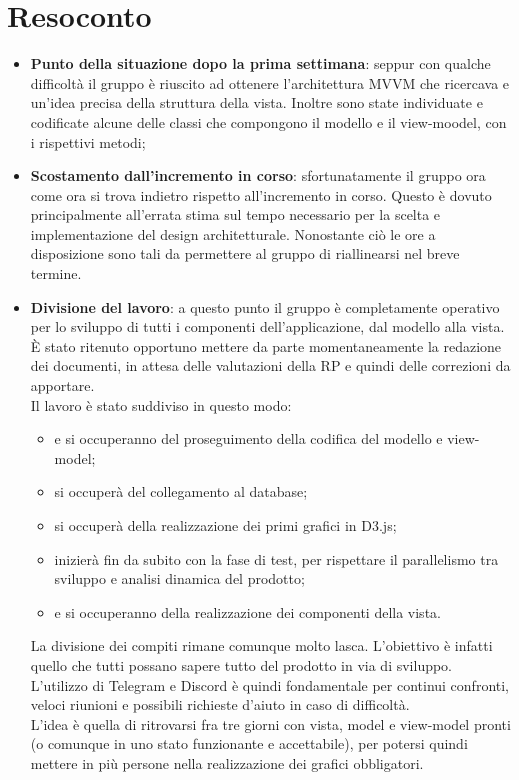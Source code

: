 \section{Resoconto}
\begin{itemize}
	\item \textbf{Punto della situazione dopo la prima settimana}: seppur con qualche difficoltà il gruppo è riuscito ad ottenere  l'architettura MVVM che ricercava e un'idea precisa della struttura della vista. Inoltre sono state individuate e codificate alcune delle classi che compongono il modello e il view-moodel, con i rispettivi metodi;
	\item \textbf{Scostamento dall'incremento in corso}: sfortunatamente il gruppo ora come ora si trova indietro rispetto all'incremento in corso. Questo è dovuto principalmente all'errata stima sul tempo necessario per la scelta e implementazione del design architetturale. Nonostante ciò le ore a disposizione sono tali da permettere al gruppo di riallinearsi nel breve termine.
	\item  \textbf{Divisione del lavoro}: a questo punto il gruppo è completamente operativo per lo sviluppo di tutti i componenti dell'applicazione, dal modello alla vista. È stato ritenuto opportuno mettere da parte momentaneamente la redazione dei documenti, in attesa delle valutazioni della RP e quindi delle correzioni da apportare. \\
	Il lavoro è stato suddiviso in questo modo:
	\begin{itemize}
		\item \BM{} e \SG{} si occuperanno del proseguimento della codifica del modello e view-model;
		\item \SH{} si occuperà del collegamento al database;
		\item \PA{} si occuperà della realizzazione dei primi grafici in D3.js;
		\item \ZM{} inizierà fin da subito con la fase di test, per rispettare il parallelismo tra sviluppo e analisi dinamica del prodotto;
		\item \SP{} e \RA{} si occuperanno della realizzazione dei componenti della vista.
	\end{itemize}
	La divisione dei compiti rimane comunque molto lasca. L'obiettivo è infatti quello che tutti possano sapere tutto del prodotto in via di sviluppo. L'utilizzo di Telegram e Discord è quindi fondamentale per continui confronti, veloci riunioni e possibili richieste d'aiuto in caso di difficoltà. \\
	L'idea è quella di ritrovarsi fra tre giorni con vista, model e view-model pronti (o comunque in uno stato funzionante e accettabile), per potersi quindi mettere in più persone nella realizzazione dei grafici obbligatori.      
\end{itemize}


